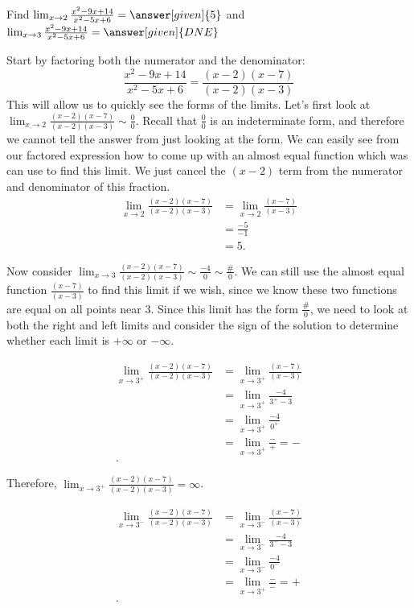 \documentclass{ximera}
\begin{document}
\begin{example}
Find $\lim_{x\to 2} \frac{x^2-9x+14}{x^2-5x+6} = \answer[given]{5}$ and  $\lim_{x\to 3} \frac{x^2-9x+14}{x^2-5x+6}= \answer[given]{DNE} $

\begin{explanation}
Start by factoring both the numerator and the denominator:
\[
\frac{x^2-9x+14}{x^2-5x+6} = \frac{(x-2)(x-7)}{(x-2)(x-3)}
\]
This will allow us to quickly see the forms of the limits.  Let's first look at $\lim_{x\to 2} \frac{(x-2)(x-7)}{(x-2)(x-3)} \sim \frac{0}{0}$.  Recall that $\frac{0}{0}$ is an indeterminate form, and therefore we cannot tell the answer from just looking at the form.  We can easily see from our factored expression how to come up with an almost equal function which was can use to find this limit.  We just cancel the $(x-2)$ term from the numerator and denominator of this fraction.
\begin{align*}
\lim_{x\to 2} \frac{(x-2)(x-7)}{(x-2)(x-3)} &= \lim_{x\to 2} \frac{(x-7)}{(x-3)}\\
&= \frac{-5}{-1}\\
&=5.
\end{align*}

Now consider $\lim_{x\to 3} \frac{(x-2)(x-7)}{(x-2)(x-3)} \sim \frac{-4}{0} \sim \frac{\#}{0}$.   We can still use the almost equal function $\frac{(x-7)}{(x-3)}$ to find this limit if we wish, since we know these two functions are equal on all points near 3.  Since this limit has the form $\frac{\#}{0}$, we need to look at both the right and left limits and consider the sign of the solution to determine whether each limit is $+\infty$ or $-\infty$.

\begin{align*}
\lim_{x\to 3^+} \frac{(x-2)(x-7)}{(x-2)(x-3)} &= \lim_{x\to 3^+} \frac{(x-7)}{(x-3)}\\
&= \lim_{x\to 3^+}\frac{-4}{3^+ -3}\\
&= \lim_{x\to 3^+}\frac{-4}{0^+}\\
&= \lim_{x\to 3^+}\frac{-}{+} = -\\.
\end{align*}

Therefore, $\lim_{x\to 3^+} \frac{(x-2)(x-7)}{(x-2)(x-3)} = \infty$.

\begin{align*}
\lim_{x\to 3^-} \frac{(x-2)(x-7)}{(x-2)(x-3)} &= \lim_{x\to 3^-} \frac{(x-7)}{(x-3)}\\
&= \lim_{x\to 3^-}\frac{-4}{3^- -3}\\
&= \lim_{x\to 3^-}\frac{-4}{0^-}\\
&= \lim_{x\to 3^+}\frac{-}{-} = +\\.
\end{align*}


\end{explanation}
\end{example}
\end{document}
